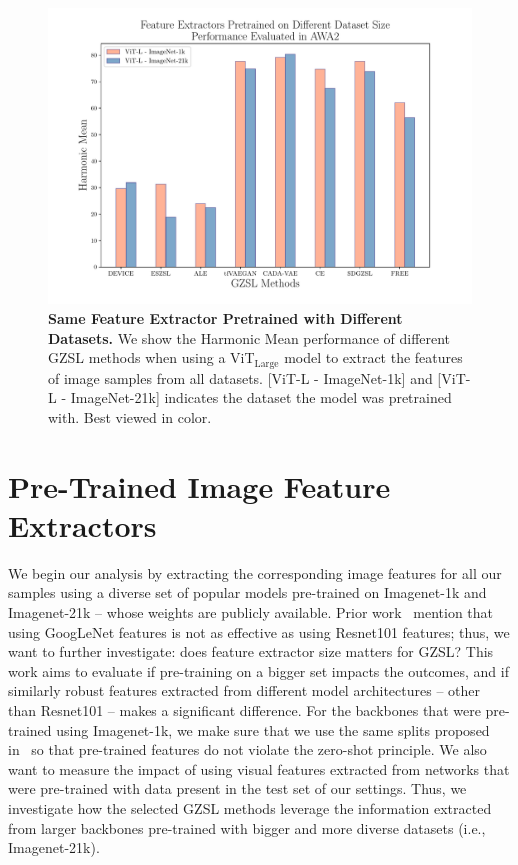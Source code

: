 \begin{figure}[h!]
{\begin{minipage}[t]{0.33\textwidth}
\end{minipage}%
\hfill
\begin{minipage}[t]{0.33\textwidth}
  \includegraphics[align=t,width=\linewidth]{Images/awa2_diff_data_size.pdf}
\end{minipage}%
}
 \vspace{-0.05in}
 \caption{\textbf{Same Feature Extractor Pretrained with Different Datasets.} We show the Harmonic Mean performance of different GZSL methods when using a ViT$_{\text{Large}}$ model to extract the features of image samples from all datasets. [ViT-L - ImageNet-1k] and [ViT-L - ImageNet-21k] indicates the dataset the model was pretrained with. Best viewed in color.}
 \label{fig:model_backbone_data_size}
\end{figure}



\section{Pre-Trained Image Feature Extractors}

We begin our analysis by extracting the corresponding image features for all our samples using a diverse set of popular models pre-trained on Imagenet-1k and Imagenet-21k -- whose weights are publicly available. Prior work~\cite{AWA2} mention that using GoogLeNet features is not as effective as using Resnet101 features; thus, we want to further investigate: does feature extractor size matters for GZSL? This work aims to evaluate if pre-training on a bigger set impacts the outcomes, and if similarly robust features extracted from different model architectures -- other than Resnet101 -- makes a significant difference. 
For the backbones that were pre-trained using Imagenet-1k, we make sure that we use the same splits proposed in~\cite{AWA2} so that pre-trained features do not violate the zero-shot principle. 
We also want to measure the impact of using visual features extracted from networks that were pre-trained with data present in the test set of our settings. Thus, we investigate how the selected GZSL methods leverage the information extracted from larger backbones pre-trained with bigger and more diverse datasets (i.e., Imagenet-21k). 





